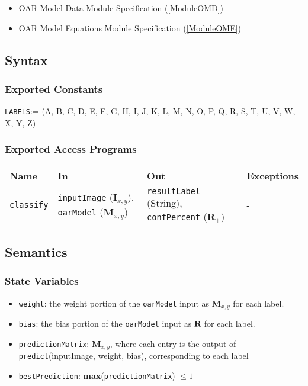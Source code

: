 \documentclass[12pt, titlepage]{article}
\def\code#1{\texttt{#1}}
\begin{document}
\begin{itemize}
  \item OAR Model Data Module Specification (\ref{ModuleOMD})
  \item OAR Model Equations Module Specification (\ref{ModuleOME})
\end{itemize}

\subsection{Syntax}

\subsubsection{Exported Constants}

\code{LABELS}:= (A, B, C, D, E, F, G, H, I, J, K, L, M, N, O, P, Q, R, S, T, U, V, W, X, Y, Z)

\subsubsection{Exported Access Programs}

\begin{center}
\begin{tabular}{p{2cm} p{4cm} p{4cm} p{2cm}}
\hline
\textbf{Name} & \textbf{In} & \textbf{Out} & \textbf{Exceptions} \\
\hline
\code{classify} & \code{inputImage} ($\mathbf{I}_{x,y}$), \code{oarModel} ($\mathbf{M}_{x,y}$) & \code{resultLabel} (String), \code{confPercent} ($\mathbf{R}_{+}$) & - \\
\hline
\end{tabular}
\end{center}

\subsection{Semantics}

\subsubsection{State Variables}

\begin{itemize}
  \item \code{weight}: the weight portion of the \code{oarModel} input as $\mathbf{M}_{x,y}$ for each label.
  \item \code{bias}: the bias portion of the \code{oarModel} input as $\mathbf{R}$ for each label.
  \item \code{predictionMatrix}: $\mathbf{M}_{x,y}$, where each entry is the output of \code{predict}(inputImage, weight, bias), corresponding to each label
  \item \code{bestPrediction}: \textbf{max}(\code{predictionMatrix}) $\leq 1$
\end{itemize}
\end{document}
